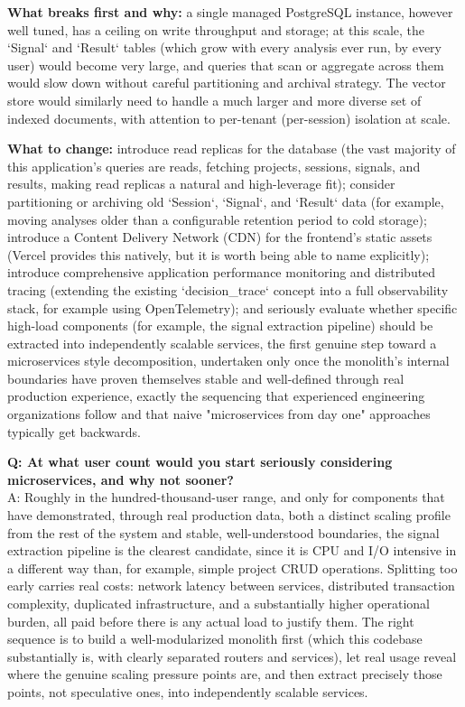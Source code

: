 \documentclass[11pt,a4paper]{report}
\begin{document}
\textbf{What breaks first and why:} a single managed PostgreSQL instance, however well tuned, has a ceiling on write throughput and storage; at this scale, the `Signal` and `Result` tables (which grow with every analysis ever run, by every user) would become very large, and queries that scan or aggregate across them would slow down without careful partitioning and archival strategy. The vector store would similarly need to handle a much larger and more diverse set of indexed documents, with attention to per-tenant (per-session) isolation at scale.

\textbf{What to change:} introduce read replicas for the database (the vast majority of this application's queries are reads, fetching projects, sessions, signals, and results, making read replicas a natural and high-leverage fit); consider partitioning or archiving old `Session`, `Signal`, and `Result` data (for example, moving analyses older than a configurable retention period to cold storage); introduce a Content Delivery Network (CDN) for the frontend's static assets (Vercel provides this natively, but it is worth being able to name explicitly); introduce comprehensive application performance monitoring and distributed tracing (extending the existing `decision\_trace` concept into a full observability stack, for example using OpenTelemetry); and seriously evaluate whether specific high-load components (for example, the signal extraction pipeline) should be extracted into independently scalable services, the first genuine step toward a microservices style decomposition, undertaken only once the monolith's internal boundaries have proven themselves stable and well-defined through real production experience, exactly the sequencing that experienced engineering organizations follow and that naive "microservices from day one" approaches typically get backwards.

\begin{qabox}
\textbf{Q: At what user count would you start seriously considering microservices, and why not sooner?} \\
A: Roughly in the hundred-thousand-user range, and only for components that have demonstrated, through real production data, both a distinct scaling profile from the rest of the system and stable, well-understood boundaries, the signal extraction pipeline is the clearest candidate, since it is CPU and I/O intensive in a different way than, for example, simple project CRUD operations. Splitting too early carries real costs: network latency between services, distributed transaction complexity, duplicated infrastructure, and a substantially higher operational burden, all paid before there is any actual load to justify them. The right sequence is to build a well-modularized monolith first (which this codebase substantially is, with clearly separated routers and services), let real usage reveal where the genuine scaling pressure points are, and then extract precisely those points, not speculative ones, into independently scalable services.
\end{qabox}
\end{document}
